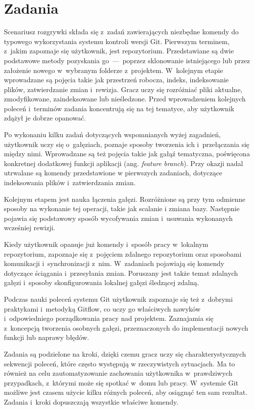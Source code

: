 \documentclass[12pt,a4paper,polish,thesis]{dcsbook}
\begin{document}
{	\section{Zadania}
	
	Scenariusz rozgrywki składa się z~zadań zawierających niezbędne komendy do typowego wykorzystania systemu kontroli wersji Git. Pierwszym terminem, z~jakim zapoznaje się użytkownik, jest repozytorium. Przedstawiane są dwie podstawowe metody pozyskania go~---~poprzez sklonowanie istniejącego lub przez założenie nowego w~wybranym folderze z~projektem. W~kolejnym etapie wprowadzane są pojęcia takie jak przestrzeń robocza, indeks, indeksowanie plików, zatwierdzanie zmian i~rewizja. Gracz uczy się rozróżniać pliki aktualne, zmodyfikowane, zaindeksowane lub nieśledzone. Przed wprowadzeniem kolejnych poleceń i~terminów zadania koncentrują się na tej tematyce, aby użytkownik zdążył je dobrze opanować. 
	
	Po wykonaniu kilku zadań dotyczących wspomnianych wyżej zagadnień, użytkownik uczy się o~gałęziach, poznaje sposoby tworzenia ich i~przełączania się między nimi. Wprowadzane są też pojęcia takie jak gałąź tematyczna, poświęcona konkretnej dodatkowej funkcji aplikacji (ang. \textit{feature branch}). Przy okazji nadal utrwalane są komendy przedstawione w pierwszych zadaniach, dotyczące indeksowania plików i~zatwierdzania zmian. 

	Kolejnym etapem jest nauka łączenia gałęzi. Rozróżnione są przy tym odmienne sposoby na wykonanie tej operacji, takie jak scalanie i zmiana bazy. Następnie pojawia się podstawowy sposób wycofywania zmian i~usuwania wykonanych wcześniej rewizji.

	Kiedy użytkownik opanuje już komendy i~sposób pracy w~lokalnym repozytorium, zapoznaje się z~pojęciem zdalnego repozytorium oraz sposobami komunikacji i~synchronizacji z~nim. W~zadaniach pojawiają się komendy dotyczące ściągania i~przesyłania zmian. Poruszany jest także temat zdalnych gałęzi i~sposoby skonfigurowania lokalnej gałęzi śledzącej zdalną.
	
	Podczas nauki poleceń systemu Git użytkownik zapoznaje się też z~dobrymi praktykami i~metodyką Gitflow, co uczy go właściwych nawyków i~odpowiedniego porządkowania pracy nad projektem. Zaznajamia się z~koncepcją tworzenia osobnych gałęzi, przeznaczonych do implementacji nowych funkcji lub naprawy błędów.
	
	Zadania są podzielone na kroki, dzięki czemu gracz uczy się charakterystycznych sekwencji poleceń, które często występują w rzeczywistych sytuacjach. Ma to również na celu zautomatyzowanie zachowania użytkownika w~prawdziwych przypadkach, z~którymi może się spotkać w~domu lub pracy. W~systemie Git możliwe jest czasem użycie kilku różnych poleceń, aby osiągnąć ten sam rezultat. Zadania i~kroki dopuszczają wszystkie właściwe komendy.
	
}
\end{document}
